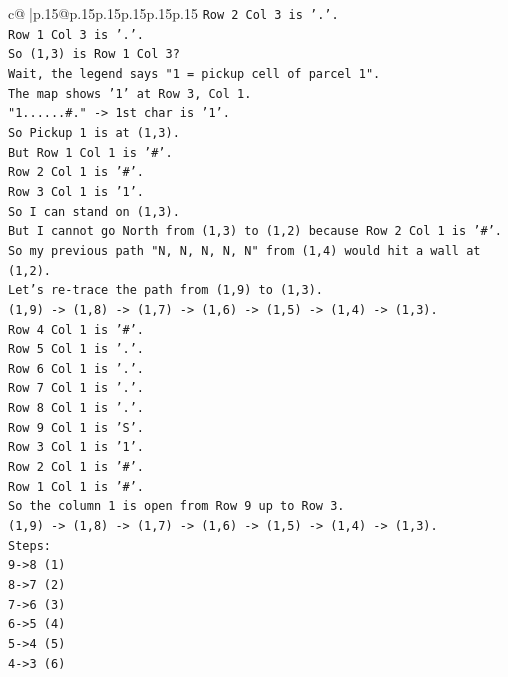 \documentclass{article}
\begin{document}
{\begin{supertabular}{c@{$\;$}|p{.15\linewidth}@{}p{.15\linewidth}p{.15\linewidth}p{.15\linewidth}p{.15\linewidth}p{.15\linewidth}}
{{{\texttt{Row 2 Col 3 is '.'.} \\
\texttt{Row 1 Col 3 is '.'.} \\
\texttt{So (1,3) is Row 1 Col 3?} \\
\texttt{Wait, the legend says "1 = pickup cell of parcel 1".} \\
\texttt{The map shows '1' at Row 3, Col 1.} \\
\texttt{"1......\#." {-}> 1st char is '1'.} \\
\texttt{So Pickup 1 is at (1,3).} \\
\texttt{But Row 1 Col 1 is '\#'.} \\
\texttt{Row 2 Col 1 is '\#'.} \\
\texttt{Row 3 Col 1 is '1'.} \\
\texttt{So I can stand on (1,3).} \\
\texttt{But I cannot go North from (1,3) to (1,2) because Row 2 Col 1 is '\#'.} \\
\texttt{So my previous path "N, N, N, N, N" from (1,4) would hit a wall at (1,2).} \\
\texttt{Let's re{-}trace the path from (1,9) to (1,3).} \\
\texttt{(1,9) {-}> (1,8) {-}> (1,7) {-}> (1,6) {-}> (1,5) {-}> (1,4) {-}> (1,3).} \\
\texttt{Row 4 Col 1 is '\#'.} \\
\texttt{Row 5 Col 1 is '.'.} \\
\texttt{Row 6 Col 1 is '.'.} \\
\texttt{Row 7 Col 1 is '.'.} \\
\texttt{Row 8 Col 1 is '.'.} \\
\texttt{Row 9 Col 1 is 'S'.} \\
\texttt{Row 3 Col 1 is '1'.} \\
\texttt{Row 2 Col 1 is '\#'.} \\
\texttt{Row 1 Col 1 is '\#'.} \\
\texttt{So the column 1 is open from Row 9 up to Row 3.} \\
\texttt{(1,9) {-}> (1,8) {-}> (1,7) {-}> (1,6) {-}> (1,5) {-}> (1,4) {-}> (1,3).} \\
\texttt{Steps:} \\
\texttt{9{-}>8 (1)} \\
\texttt{8{-}>7 (2)} \\
\texttt{7{-}>6 (3)} \\
\texttt{6{-}>5 (4)} \\
\texttt{5{-}>4 (5)} \\
\texttt{4{-}>3 (6)} \\
}}}
\end{supertabular}}
\end{document}
